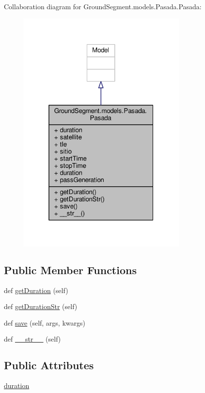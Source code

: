 Collaboration diagram for Ground\+Segment.\+models.\+Pasada.\+Pasada\+:\nopagebreak
\begin{figure}[H]
\begin{center}
\leavevmode
\includegraphics[width=241pt]{class_ground_segment_1_1models_1_1_pasada_1_1_pasada__coll__graph}
\end{center}
\end{figure}
\subsection*{Public Member Functions}
\begin{DoxyCompactItemize}
\item 
def \hyperlink{class_ground_segment_1_1models_1_1_pasada_1_1_pasada_a5ebf93a5abcf180da3364d16e10b815c}{get\+Duration} (self)
\item 
def \hyperlink{class_ground_segment_1_1models_1_1_pasada_1_1_pasada_a2f5fbff968ce6c18102c2625e56f1bb4}{get\+Duration\+Str} (self)
\item 
def \hyperlink{class_ground_segment_1_1models_1_1_pasada_1_1_pasada_a248f194ba062a30f8def562434bc4f96}{save} (self, args, kwargs)
\item 
def \hyperlink{class_ground_segment_1_1models_1_1_pasada_1_1_pasada_a5c21dff9dda2ed2fa07752dfb0c1938b}{\+\_\+\+\_\+str\+\_\+\+\_\+} (self)
\end{DoxyCompactItemize}
\subsection*{Public Attributes}
\begin{DoxyCompactItemize}
\item 
\hyperlink{class_ground_segment_1_1models_1_1_pasada_1_1_pasada_abeb6ca27acba910e5302a04ff09f70fd}{duration}
\end{DoxyCompactItemize}
